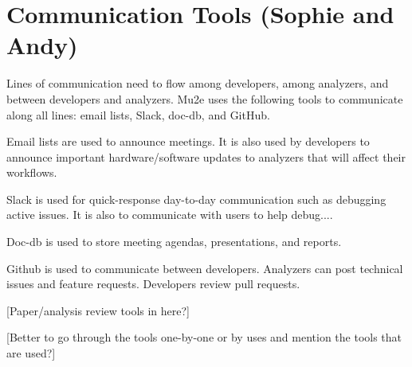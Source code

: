 \section{Communication Tools (Sophie and Andy)}
Lines of communication need to flow among developers, among analyzers, and between developers and analyzers. Mu2e uses the following tools to communicate along all lines: email lists, Slack, doc-db, and GitHub.

Email lists are used to announce meetings. It is also used by developers to announce important hardware/software updates to analyzers that will affect their workflows.

Slack is used for quick-response day-to-day communication such as debugging active issues. It is also to communicate with users to help debug....

Doc-db is used to store meeting agendas, presentations, and reports.

Github is used to communicate between developers. Analyzers can post technical issues and feature requests. Developers review pull requests.

[Paper/analysis review tools in here?]

[Better to go through the tools one-by-one or by uses and mention the tools that are used?]


